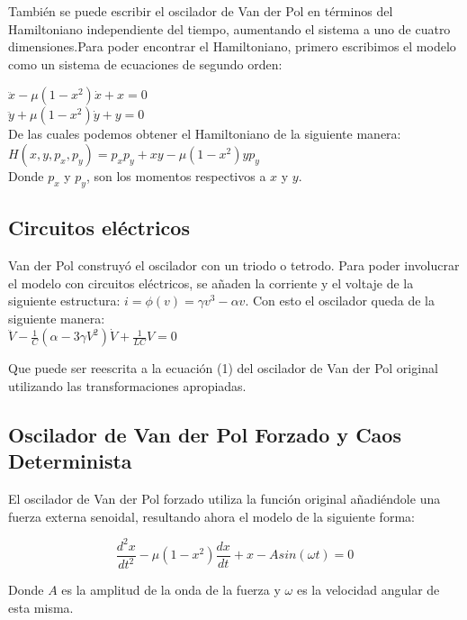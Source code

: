\documentclass[12pt]{article}
\begin{document}
También se puede escribir el oscilador de Van der Pol en términos del Hamiltoniano independiente del tiempo, aumentando el sistema a uno de cuatro dimensiones.Para poder encontrar el Hamiltoniano, primero escribimos el modelo como un sistema de ecuaciones de segundo orden:

\centering $\ddot{x}-\mu(1-x^2)\dot{x}+x=0$\\
$\ddot{y}+\mu(1-x^2)\dot{y}+y=0$ \\

\justify
De las cuales podemos obtener el Hamiltoniano de la siguiente manera: \\

\centering $H(x,y,p_x, p_y)=p_x p_y +xy -\mu(1-x^2)yp_y$ \\

\justify
Donde $p_x$ y $p_y$, son los momentos respectivos a $x$ y $y$.

\subsection{Circuitos eléctricos}

Van der Pol construyó el oscilador con un triodo o tetrodo. Para poder involucrar el modelo con circuitos eléctricos, se añaden la corriente y el voltaje de la siguiente estructura: $i= \phi(v)= \gamma v^3 -\alpha v$. Con esto el oscilador queda de la siguiente manera: \\

\centering $\ddot{V}-\frac{1}{C}(\alpha -3\gamma V^2)\dot{V}+ \frac{1}{LC}V=0$

\justify

Que puede ser reescrita a la ecuación (1) del oscilador de Van der Pol original utilizando las transformaciones apropiadas. 

\subsection{Oscilador de Van der Pol Forzado y Caos Determinista}

El oscilador de Van der Pol forzado utiliza la función original añadiéndole una fuerza externa senoidal, resultando ahora el modelo de la siguiente forma:

\begin{equation}
\frac{d^2x}{dt^2} -\mu (1-x^2) \frac{dx}{dt}+x-Asin(\omega t)=0
\end{equation}

Donde $A$ es la amplitud de la onda de la fuerza y $\omega$ es la velocidad angular de esta misma.\\
\end{document}
